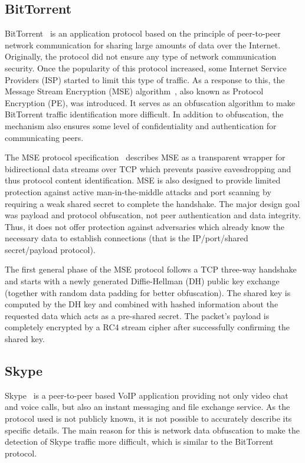 
\subsection{BitTorrent}
BitTorrent~\cite{bittorrent-specification} is an application protocol based on the principle of peer-to-peer network communication for sharing large amounts of data over the Internet. Originally, the protocol did not ensure any type of network communication security. Once the popularity of this protocol increased, some Internet Service Providers (ISP) started to limit this type of traffic. As a response to this, the Message Stream Encryption (MSE) algorithm~\cite{mse-specification}, also known as Protocol Encryption (PE), was introduced. It serves as an obfuscation algorithm to make BitTorrent traffic identification more difficult. In addition to obfuscation, the mechanism also ensures some level of confidentiality and authentication for communicating peers.

The MSE protocol specification~\cite{mse-specification} describes MSE as a transparent wrapper for bidirectional data streams over TCP which prevents passive eavesdropping and thus protocol content identification. MSE is also designed to provide limited protection against active man-in-the-middle attacks and port scanning by requiring a weak shared secret to complete the handshake. The major design goal was payload and protocol obfuscation, not peer authentication and data integrity. Thus, it does not offer protection against adversaries which already know the necessary data to establish connections (that is the IP/port/shared secret/payload protocol).

The first general phase of the MSE protocol follows a TCP three-way handshake and starts with a newly generated Diffie-Hellman (DH) public key exchange (together with random data padding for better obfuscation). The shared key is computed by the DH key and combined with hashed information about the requested data which acts as a pre-shared secret. The packet's payload is completely encrypted by a RC4 stream cipher after successfully confirming the shared key.


\subsection{Skype}
Skype~\cite{skype-web} is a peer-to-peer based VoIP application providing not only video chat and voice calls, but also an instant messaging and file exchange service. As the protocol used is not publicly known, it is not possible to accurately describe its specific details. The main reason for this is network data obfuscation to make the detection of Skype traffic more difficult, which is similar to the BitTorrent protocol.

